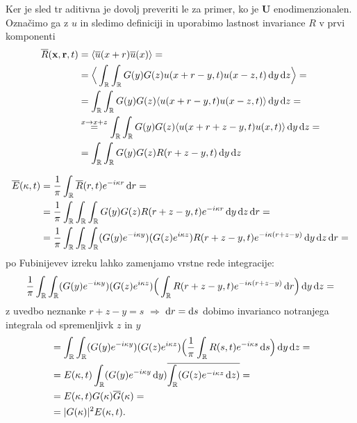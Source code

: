 \documentclass[mat2, tisk]{fmfdelo}
\newcommand{\R}{\mathbb R}
\newcommand{\bd}{\textbf}
\begin{document}
\begin{dokaz}
Ker je sled tr aditivna je dovolj preveriti le za primer, ko je 
$\bd{U}$ enodimenzionalen. Označimo ga z $u$ in sledimo definiciji 
in uporabimo lastnost invariance $R$ v prvi komponenti
\begin{align*}
\overline{R}(\bd{x}, \bd{r}, t) &= \langle \overline{u}(x + r) \overline{u}(x) \rangle = \\
&= \Big\langle\int_\R \int_\R G(y) G(z) u(x+r-y, t) u(x-z, t) \dif y \dif z\Big\rangle = \\
&= \int_\R \int_\R G(y) G(z) \langle u(x+r-y, t) u(x-z, t) \rangle \dif y \dif z = \\
&\stackrel{x \rightarrow x + z}{=} \int_\R \int_\R G(y) G(z) \langle u(x+r+z-y, t) u(x, t) \rangle \dif y \dif z = \\
&= \int_\R \int_\R G(y) G(z) R(r+z-y, t) \dif y \dif z
\end{align*}

\begin{align*}
\overline{E}(\kappa, t) &= \frac{1}{\pi} \int_\R \overline{R}(r, t) e^{-i\kappa r} \dif r = \\
&= \frac{1}{\pi}\int_{\R} \int_{\R} \int_\R G(y) G(z) R(r+z-y,t) e^{-i\kappa r} \dif y \dif z \dif r = \\
&= \frac{1}{\pi}\int_{\R} \int_{\R} \int_\R (G(y) e^{-i\kappa y}) (G(z) e^{i\kappa z}) R(r+z-y,t) e^{-i\kappa(r+z-y)} \dif y \dif z \dif r = 
\end{align*}
po Fubinijevev izreku lahko zamenjamo vrstne rede integracije: 
\begin{align*}
\frac{1}{\pi}\int_{\R} \int_\R (G(y) e^{-i\kappa y}) (G(z) e^{i\kappa z}) \Big(\int_{\R} R(r+z-y,t) e^{-i\kappa(r+z-y)} \dif r \Big) \dif y \dif z =
\end{align*}
z uvedbo neznanke $r + z - y = s$ $\Longrightarrow$ $\dif r = \dif s$ dobimo invarianco notranjega integrala od
spremenljivk $z$ in $y$
\begin{align*}
&= \int_{\R} \int_\R (G(y) e^{-i\kappa y}) (G(z) e^{i\kappa z}) \Big(\frac{1}{\pi}\int_{\R} R(s,t) e^{-i\kappa s} \dif s \Big) \dif y \dif z = \\
&= E(\kappa, t) \int_\R (G(y) e^{-i\kappa y}\dif y) \overline{\int_{\R} (G(z) e^{-i\kappa z} \dif z)}  = \\
&= E(\kappa, t) G(\kappa) \overline{G}(\kappa) = \\
&= |G(\kappa)|^2 E(\kappa, t).
\end{align*}
\end{dokaz}
\end{document}
